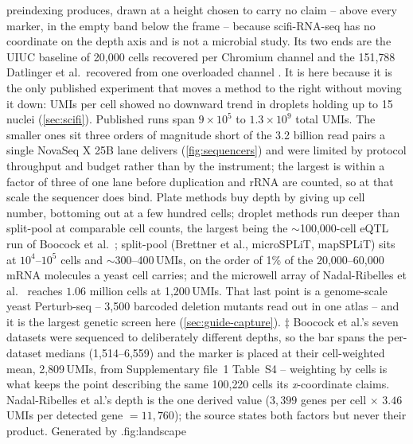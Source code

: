 {  preindexing produces, drawn at a height chosen to carry no claim -- above every
  marker, in the empty band below the frame -- because scifi-RNA-seq has no
  coordinate on the depth axis and is not a microbial study. Its two ends are the
  UIUC baseline of 20{,}000 cells recovered per Chromium channel and the 151{,}788
  Datlinger et al.\ recovered from one overloaded channel
  \citep{datlingerUltrahighthroughputSinglecellRNA2021}. It is here because it is
  the only published experiment that moves a method to the right without moving it
  down: UMIs per cell showed no downward trend in droplets holding up to 15 nuclei
  (\cref{sec:scifi}).
  Published runs span $9\times10^{5}$ to $1.3\times10^{9}$ total UMIs. The smaller
  ones sit three orders of magnitude short of the 3.2 billion read pairs a single
  NovaSeq X 25B lane delivers (\cref{fig:sequencers}) and were limited by protocol
  throughput and budget rather than by the instrument; the largest is within a
  factor of three of one lane before duplication and rRNA are counted, so at that
  scale the sequencer does bind. Plate methods buy depth by giving up cell number,
  bottoming out at a few hundred cells; droplet methods run deeper than split-pool
  at comparable cell counts, the largest being the $\sim$100{,}000-cell eQTL run
  of Boocock et al.\ \citep{boocockSinglecellEQTLMapping2025}; split-pool
  (Brettner et al., microSPLiT, mapSPLiT) sits at $10^{4}$--$10^{5}$ cells and
  $\sim$300--400\,UMIs, on the order of 1\% of the 20{,}000--60{,}000 mRNA
  molecules a yeast cell carries; and the microwell array of Nadal-Ribelles et
  al.\ \citep{nadal-ribellesSinglecellResolvedGenotypephenotype2025} reaches
  $1.06$ million cells at 1{,}200\,UMIs. That last point is a genome-scale yeast
  Perturb-seq -- 3{,}500 barcoded deletion mutants read out in one atlas -- and
  it is the largest genetic screen here (\cref{sec:guide-capture}).
  $\ddagger$ Boocock et al.'s seven datasets were sequenced to deliberately
  different depths, so the bar spans the per-dataset medians
  (1{,}514--6{,}559) and the marker is placed at their cell-weighted mean,
  2{,}809\,UMIs, from Supplementary file~1 Table~S4 -- weighting by cells is what
  keeps the point describing the same 100{,}220 cells its \emph{x}-coordinate
  claims. Nadal-Ribelles et al.'s depth is the one derived value
  ($3{,}399$ genes per cell $\times$ $3.46$ UMIs per detected gene $= 11{,}760$);
  the source states both factors but never their product. Generated by
  .}{fig:landscape}

